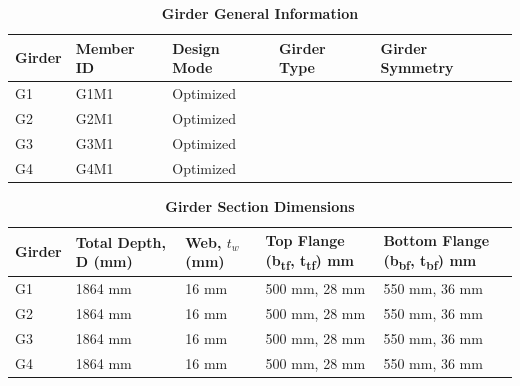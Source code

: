 \documentclass[12pt,a4paper]{report}
\numberwithin{table}{chapter}
\numberwithin{figure}{chapter}
\begin{document}
\newpage

\vspace{0.4em}
\noindent
            
\vspace{4pt}
\begin{longtable}{|L{2.2cm}|L{1.8cm}|p{3.8cm}|p{3.8cm}|p{3.8cm}|}
\caption{\textbf{Girder General Information}}
\hline
\textbf{Girder} & \textbf{Member ID} & \textbf{Design Mode} & \textbf{Girder Type} & \textbf{Girder Symmetry} \\[6pt]
\hline
G1 & G1M1 & Optimized &  &  \\[8pt]
\hline
G2 & G2M1 & Optimized &  &  \\[8pt]
\hline
G3 & G3M1 & Optimized &  &  \\[8pt]
\hline
G4 & G4M1 & Optimized &  &  \\[8pt]
\hline
\end{longtable}

\vspace{0.6em}

\vspace{4pt}
\begin{longtable}{|L{1.8cm}|L{2.3cm}|L{1.8cm}|p{4.8cm}|p{4.8cm}|}
\caption{\textbf{Girder Section Dimensions}}
\hline
\textbf{Girder} & \textbf{Total Depth, D (mm)} & \textbf{Web, $t_w$ (mm)} & \textbf{Top Flange (b\textsubscript{tf}, t\textsubscript{tf}) mm} & \textbf{Bottom Flange (b\textsubscript{bf}, t\textsubscript{bf}) mm} \\[6pt]
\hline
G1 & 1864 mm & 16 mm & 500 mm, 28 mm & 550 mm, 36 mm \\[8pt]
\hline
G2 & 1864 mm & 16 mm & 500 mm, 28 mm & 550 mm, 36 mm \\[8pt]
\hline
G3 & 1864 mm & 16 mm & 500 mm, 28 mm & 550 mm, 36 mm \\[8pt]
\hline
G4 & 1864 mm & 16 mm & 500 mm, 28 mm & 550 mm, 36 mm \\[8pt]
\hline
\end{longtable}

\vspace{0.6em}
\end{document}
